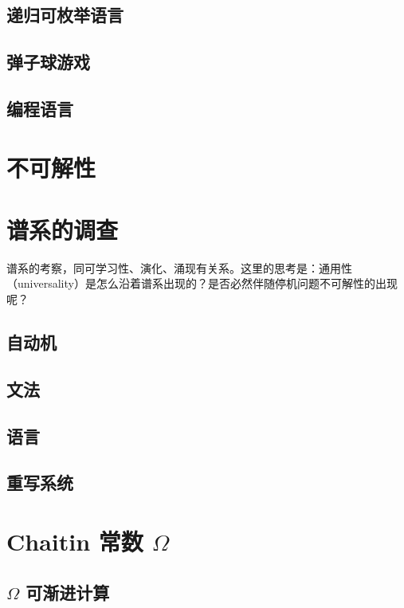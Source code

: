 \documentclass[a4paper,12pt]{article}
\numberwithin{problem}{section}
\numberwithin{definition}{section}
\numberwithin{lemma}{section}
\numberwithin{proposition}{section}
\numberwithin{theorem}{section}
\numberwithin{grammar}{section}
\numberwithin{program}{section}
\numberwithin{convention}{section}
\numberwithin{corollary}{section}
\begin{document}
\subsection{递归可枚举语言}

\subsection{弹子球游戏}

\subsection{编程语言}

\newpage

\section{不可解性}

\newpage

\section{谱系的调查}

谱系的考察，同可学习性、演化、涌现有关系。这里的思考是：通用性（universality）是怎么沿着谱系出现的？是否必然伴随停机问题不可解性的出现呢？

\subsection{自动机}

\subsection{文法}

\subsection{语言}

\subsection{重写系统}

\newpage

\section{Chaitin 常数 $\Omega$}

\subsection{$\Omega$ 可渐进计算}
\end{document}
